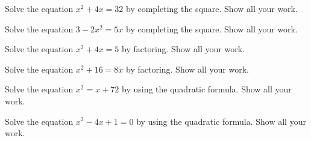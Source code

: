 \documentclass[11pt,letterpaper]{article}
\begin{document}

 Solve the equation $x^2 + 4x= 32$ by completing the square. Show all your work. \pspace





\newpage





 Solve the equation $3 - 2x^2= 5x$ by completing the square. Show all your work. \pspace





\newpage





 Solve the equation $x^2 + 4x= 5$ by factoring. Show all your work. \pspace





\newpage





 Solve the equation $x^2 + 16= 8x$ by factoring. Show all your work. \pspace





\newpage





 Solve the equation $x^2= x + 72$ by using the quadratic formula. Show all your work. \pspace





\newpage





 Solve the equation $x^2 - 4x + 1= 0$ by using the quadratic formula. Show all your work. \pspace


\end{document}
